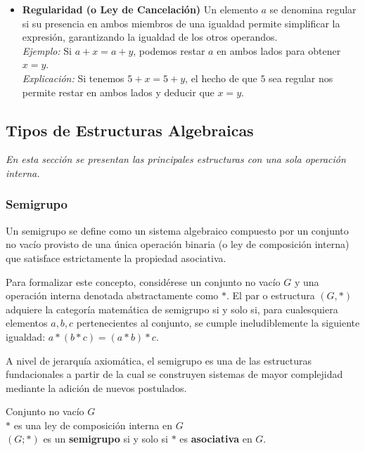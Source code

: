 \documentclass{article}
\begin{document}
\begin{itemize}
\item \textbf{Regularidad (o Ley de Cancelación)}
Un elemento $a$ se denomina regular si su presencia en ambos miembros de una igualdad permite simplificar la expresión, garantizando la igualdad de los otros operandos.\\
\textit{Ejemplo:} Si $a + x = a + y$, podemos restar $a$ en ambos lados para obtener $x = y$. \\
\textit{Explicación:} Si tenemos $5 + x = 5 + y$, el hecho de que $5$ sea regular nos permite restar en ambos lados y deducir que $x = y$. 
\bigskip

\end{itemize}



\subsection{Tipos de Estructuras Algebraicas} 
\label{sec:tipos_de_estructuras_algebraicas}

\noindent \textit{En esta sección se presentan las principales estructuras con una sola operación interna.}

\subsubsection{Semigrupo}
\label{sec:semigrupo}

Un semigrupo se define como un sistema algebraico compuesto por un conjunto no vacío provisto de una única operación binaria (o ley de composición interna) que satisface estrictamente la propiedad asociativa.

Para formalizar este concepto, considérese un conjunto no vacío $G$ y una operación interna denotada abstractamente como $*$. El par o estructura $(G, *)$ adquiere la categoría matemática de semigrupo si y solo si, para cualesquiera elementos $a, b, c$ pertenecientes al conjunto, se cumple ineludiblemente la siguiente igualdad: $a * (b * c) = (a * b) * c$.

A nivel de jerarquía axiomática, el semigrupo es una de las estructuras fundacionales a partir de la cual se construyen sistemas de mayor complejidad mediante la adición de nuevos postulados.

\begin{center}
Conjunto no vacío $G$ \\
$\ast$ es una ley de composición interna en $G$\\
$(G; \ast)$ es un \textbf{semigrupo} si y solo si $\ast$ es \textbf{asociativa} en $G$.
\end{center}
\bigskip
\end{document}
